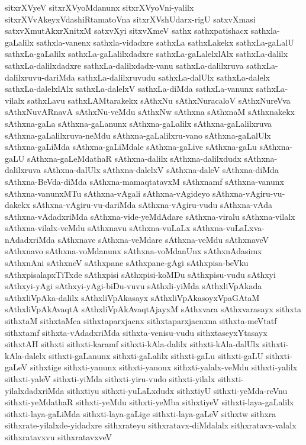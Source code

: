 {sitxrXVyeV
sitxrXVyoMdanunx
sitxrXVyoVni-yalilx
sitxrXVvAkeyxVdashiRtamatoVna
sitxrXVshUdarx-rigU
satxvXmasi
satxvXmutAkxrXnitxM
satxvXyi
sitxvXmeV
sathx
sathxpatishacx
sathxla-gaLalilx
sathxla-vanenx
sathxla-vidadxre
sathxLa
sathxLakekx
sathxLa-gaLalU
sathxLa-gaLalilx
sathxLa-gaLalilxdadxre
sathxLa-gaLalelxlAlx
sathxLa-dalilx
sathxLa-dalilxdadxre
sathxLa-dalilxdadx-vanu
sathxLa-dalilxruva
sathxLa-dalilxruvu-dariMda
sathxLa-dalilxruvudu
sathxLa-dalUlx
sathxLa-dalelx
sathxLa-dalelxlAlx
sathxLa-dalelxV
sathxLa-diMda
sathxLa-vanunx
sathxLa-vilalx
sathxLavu
sathxLAMtarakekx
sAthxNu
sAthxNuracaloV
sAthxNureVva
sAthxNuvARnavA
sAthxNu-veMdu
sAthxNw
sAthxna
sAthxnaM
sAthxnakekx
sAthxna-gaLa
sAthxna-gaLanunx
sAthxna-gaLalilx
sAthxna-gaLalilxruva
sAthxna-gaLalilxruva-neMdu
sAthxna-gaLalilxru-vano
sAthxna-gaLalUlx
sAthxna-gaLiMda
sAthxna-gaLiMdale
sAthxna-gaLive
sAthxna-gaLu
sAthxna-gaLU
sAthxna-gaLeMdathaR
sAthxna-dalilx
sAthxna-dalilxdudx
sAthxna-dalilxruva
sAthxna-dalUlx
sAthxna-dalelxV
sAthxna-daleV
sAthxna-diMda
sAthxna-BeVda-diMda
sAthxna-mamaqtatavxM
sAthxnamf
sAthxna-vanunx
sAthxna-vanunxMTu
sAthxna-vAgali
sAthxna-vAgideyo
sAthxna-vAgiru-vu-dakekx
sAthxna-vAgiru-vu-dariMda
sAthxna-vAgiru-vudu
sAthxna-vAda
sAthxna-vAdadxriMda
sAthxna-vide-yeMdAdare
sAthxna-viralu
sAthxna-vilalx
sAthxna-vilalx-veMdu
sAthxnavu
sAthxna-vuLaLx
sAthxna-vuLaLxva-nAdadxriMda
sAthxnave
sAthxna-veMdare
sAthxna-veMdu
sAthxnaveV
sAthxnavo
sAthxna-voMdanunx
sAthxna-voMdanUnx
sAthxnAdasimx
sAthxnAni
sAthxneV
sAthxpane
sAthxpane-gAgi
sAthxpisa-beVku
sAthxpisalapxTiTxde
sAthxpisi
sAthxpisi-koMDu
sAthxpisu-vudu
sAthxyi
sAthxyi-yAgi
sAthxyi-yAgi-biDu-vuvu
sAthxli-yiMda
sAthxliVpAkada
sAthxliVpAka-dalilx
sAthxliVpAkasayx
sAthxliVpAkasoyxVpaGAtaM
sAthxliVpAkAvaqtA
sAthxliVpAkAvaqtAjayxM
sAthxvara
sAthxvarasayx
sithxta
sithxtaM
sithxtaMca
sithxtaparxjacnx
sithxtaparxjacnxna
sithxta-meVtatf
sithxtamf
sithxta-vAdadxriMda
sithxta-venisu-vudu
sithxtaseyxYtasayx
sithxtAH
sithxti
sithxti-karamf
sithxti-kAla-dalilx
sithxti-kAla-dalUlx
sithxti-kAla-dalelx
sithxti-gaLanunx
sithxti-gaLalilx
sithxti-gaLu
sithxti-gaLU
sithxti-gaLeV
sithxtige
sithxti-yanunx
sithxti-yanonx
sithxti-yalalx-veMdu
sithxti-yalilx
sithxti-yaleV
sithxti-yiMda
sithxti-yiru-vudo
sithxti-yilalx
sithxti-yilalxdadxriMda
sithxtiyu
sithxti-yuLaLxdudx
sithxtiyU
sithxti-yeMda-reVnu
sithxti-yeMdathaR
sithxti-yeMdu
sithxti-yeMba
sithxtiyeV
sithxti-laya-gaLalilx
sithxti-laya-gaLiMda
sithxti-laya-gaLige
sithxti-laya-gaLeV
sithxtw
sithxra
sithxrate-yilalxde-yidadxre
sithxrateyu
sithxratavx-diMdalalx
sithxratavx-valalx
sithxratavxvu
sithxratavxveV
}
